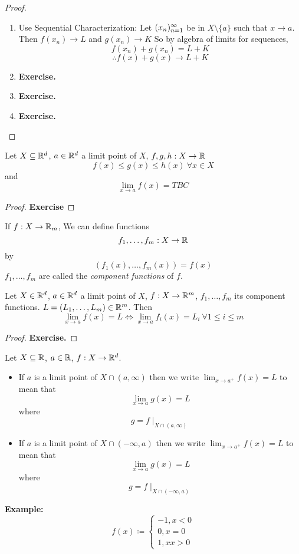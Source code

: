 \documentclass[openany]{report}
\begin{document}
\begin{proof}
    \begin{enumerate}[label=(\roman*)]
        \item Use Sequential Characterization: Let $({x}_n)_{n=1}^\infty$ be in $X \setminus \{a\}$
        such that $x \rightarrow a$. Then $f(x_n) \rightarrow L$ and $g(x_n) \rightarrow K$
        So by algebra of limits for sequences, 
        $$f(x_n) + g(x_n) = L + K$$
        $$\therefore f(x) + g(x) \rightarrow L + K$$
        \item \textbf{Exercise.}
        \item \textbf{Exercise.}
        \item \textbf{Exercise.}
    \end{enumerate}
\end{proof}
\begin{theorem}
    Let $X \subseteq \mathbb{R}^d$, $a \in \mathbb{R}^d$ a limit point of $X$, 
    $f,g,h: X \rightarrow \mathbb{R}$
    $$f(x) \leq g(x) \leq h(x) \ \forall x \in X$$
    and 
    $$\lim_{x\rightarrow a} f(x) =  TBC$$
\end{theorem}
\begin{proof}
    \textbf{Exercise}
\end{proof}
If $f: X \rightarrow \mathbb{R}_m$, We can define functions 
$$f_1, \ldots, f_m: X \rightarrow \mathbb{R}$$
by 
$$(f_1(x), \ldots, f_m(x)) = f(x)$$
$f_1, \ldots, f_m$ are called the \emph{component functions} of $f$.
\begin{prop}
    Let $X \in \mathbb{R}^d$, $a \in \mathbb{R}^d$ a limit point of $X$, $f: X \rightarrow \mathbb{R}^m$,
    $f_1,\ldots, f_m$ its component functions. $L = (L_1, \ldots, L_m) \in \mathbb{R}^m$. Then
    $$\lim_{x\rightarrow a} f(x) = L \iff \lim_{x\rightarrow a} f_i(x) = L_i \ \forall 1 \leq i \leq m$$
\end{prop}
\begin{proof}
    \textbf{Exercise.}
\end{proof}
\begin{definition}
    Let $X \subseteq \mathbb{R}$, $a \in \mathbb{R}$, $f: X \rightarrow \mathbb{R}^d$.
    \begin{itemize}
        \item If $a$ is a limit point of $X \cap (a, \infty)$ then we write
            $\lim_{x\rightarrow a^+} f(x) = L$ to mean that 
            $$\lim_{x \rightarrow a} g(x) = L$$
            where 
            $$g = f \mid_{X \cap (a, \infty)}$$
        \item If $a$ is a limit point of $X \cap (-\infty,a)$ then we write
        $\lim_{x\rightarrow a^+} f(x) = L$ to mean that 
        $$\lim_{x \rightarrow a} g(x) = L$$
        where 
        $$g = f \mid_{X \cap (-\infty, a)}$$
    \end{itemize}
\end{definition}
\textbf{Example:}
$$f(x)\coloneqq \begin{cases}
    -1, x < 0\\
    0, x = 0\\
    1, x x > 0
\end{cases}$$
\end{document}
